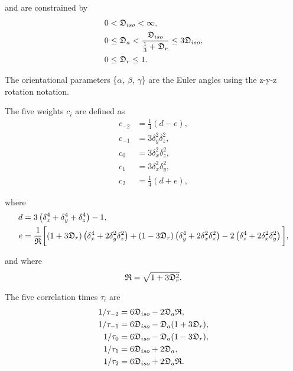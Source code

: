 \noindent and are constrained by
\begin{subequations}
\begin{align}
    0 & < \mathfrak{D}_{iso} < \infty,                                                    \label{eq: Diso lim} \\
    0 & \le \mathfrak{D}_a < \frac{\mathfrak{D}_{iso}}{\tfrac{1}{3} + \mathfrak{D}_r} \le 3\mathfrak{D}_{iso}, \label{eq: Da lim} \\
    0 & \le \mathfrak{D}_r \le 1.                                                         \label{eq: Dr lim}
\end{align}
\end{subequations}

\noindent The orientational parameters \{$\alpha$, $\beta$, $\gamma$\} are the Euler angles using the z-y-z rotation notation.


The five weights $c_i$ are defined as
\begin{subequations}
\begin{align}
    c_{-2} &= \tfrac{1}{4}(d - e),     \label{eq: ellipsoid c-2} \\
    c_{-1} &= 3\delta_y^2\delta_z^2,   \label{eq: ellipsoid c-1} \\
    c_{0}  &= 3\delta_x^2\delta_z^2,   \label{eq: ellipsoid c0} \\
    c_{1}  &= 3\delta_x^2\delta_y^2,   \label{eq: ellipsoid c1} \\
    c_{2}  &= \tfrac{1}{4}(d + e),     \label{eq: ellipsoid c2}
\end{align}
\end{subequations}

\noindent where
\begin{align}
    d &= 3 \left( \delta_x^4 + \delta_y^4 + \delta_z^4 \right) - 1, \label{eq: ellipsoid d} \\
    e &= \frac{1}{\mathfrak{R}} \bigg[ (1 + 3\mathfrak{D}_r) \left(\delta_x^4 + 2\delta_y^2\delta_z^2\right)
        + (1 - 3\mathfrak{D}_r) \left(\delta_y^4 + 2\delta_x^2\delta_z^2\right) - 2 \left(\delta_z^4 + 2\delta_x^2\delta_y^2\right) \bigg], \label{eq: ellipsoid e}
\end{align}

\noindent and where
\begin{equation}
    \mathfrak{R} = \sqrt{1 + 3\mathfrak{D}_r^2}.
\end{equation}


The five correlation times $\tau_i$ are
\begin{subequations}
\begin{align}
    1/\tau_{-2} &= 6 \mathfrak{D}_{iso} - 2\mathfrak{D}_a\mathfrak{R},   \label{eq: ellipsoid tau-2} \\
    1/\tau_{-1} &= 6 \mathfrak{D}_{iso} - \mathfrak{D}_a (1 + 3\mathfrak{D}_r), \label{eq: ellipsoid tau-1} \\
    1/\tau_{0}  &= 6 \mathfrak{D}_{iso} - \mathfrak{D}_a (1 - 3\mathfrak{D}_r), \label{eq: ellipsoid tau0} \\
    1/\tau_{1}  &= 6 \mathfrak{D}_{iso} + 2\mathfrak{D}_a,               \label{eq: ellipsoid tau1} \\
    1/\tau_{2}  &= 6 \mathfrak{D}_{iso} + 2\mathfrak{D}_a\mathfrak{R}.   \label{eq: ellipsoid tau2}
\end{align}
\end{subequations}



